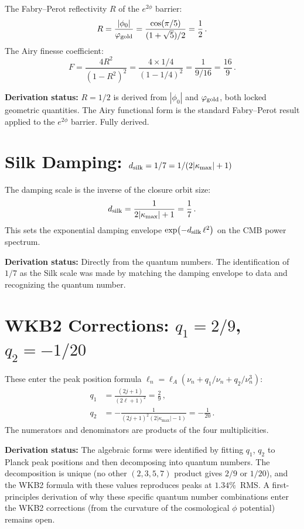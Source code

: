 \documentclass[11pt,letterpaper]{article}
\numberwithin{equation}{section}
\begin{document}
The Fabry--Perot reflectivity $R$ of the $e^{2\phi}$ barrier:
\begin{equation}
  R = \frac{|\phi_0|}{\varphi_{\rm gold}}
  = \frac{\cos(\pi/5)}{(1+\sqrt{5})/2} = \frac{1}{2}\,.
\end{equation}
The Airy finesse coefficient:
\begin{equation}
  F = \frac{4R^2}{(1-R^2)^2}
  = \frac{4 \times 1/4}{(1-1/4)^2}
  = \frac{1}{9/16} = \frac{16}{9}\,.
\end{equation}

\textbf{Derivation status:} $R = 1/2$ is derived from $|\phi_0|$ and
$\varphi_{\rm gold}$, both locked geometric quantities.  The Airy
functional form is the standard Fabry--Perot result applied to the
$e^{2\phi}$ barrier.  Fully derived.

\section{Silk Damping: $d_{\rm silk} = 1/7 = 1/(2|\kappa_{\max}|+1)$}

The damping scale is the inverse of the closure orbit size:
\begin{equation}
  d_{\rm silk} = \frac{1}{2|\kappa_{\max}|+1} = \frac{1}{7}\,.
\end{equation}
This sets the exponential damping envelope $\exp(-d_{\rm silk}\,\ell^2)$
on the CMB power spectrum.

\textbf{Derivation status:} Directly from the quantum numbers.  The
identification of $1/7$ as the Silk scale was made by matching the
damping envelope to data and recognizing the quantum number.

\section{WKB2 Corrections: $q_1 = 2/9$, $q_2 = -1/20$}

These enter the peak position formula
$\ell_n = \ell_A(\nu_n + q_1/\nu_n + q_2/\nu_n^3)$:
\begin{align}
  q_1 &= \frac{(2j+1)}{(2\ell+1)^2} = \frac{2}{9}\,,\\
  q_2 &= -\frac{1}{(2j+1)^2(2|\kappa_{\max}|-1)} = -\frac{1}{20}\,.
\end{align}
The numerators and denominators are products of the four
multiplicities.

\textbf{Derivation status:} The algebraic forms were identified by
fitting $q_1$, $q_2$ to Planck peak positions and then decomposing
into quantum numbers.  The decomposition is unique (no other
$(2,3,5,7)$ product gives $2/9$ or $1/20$), and the WKB2 formula
with these values reproduces peaks at $1.34\%$~RMS.  A
first-principles derivation of why these specific quantum number
combinations enter the WKB2 corrections (from the curvature of the
cosmological $\phi$ potential) remains open.
\end{document}
